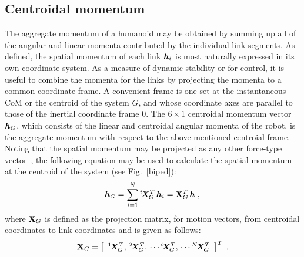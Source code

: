 \documentclass{llncs}
\newcommand{\bA}{\mbox{\boldmath $A$}}
\newcommand{\bh}{\mbox{\boldmath $h$}}
\newcommand{\bq}{\mbox{\boldmath $q$}}
\newcommand{\bqd}{\dot{\bq}}
\newcommand{\vX}{\vec{X}}
\newcommand{\bX}{{\bf X}}
\newcommand{\XM}[2]{{}^{#1}\!\vX_{\!#2}}
\begin{document}
\subsection{Centroidal momentum}

The aggregate momentum of a humanoid may be obtained by summing up all of the angular and linear momenta contributed by the individual link segments. 
As defined, the spatial momentum of each link $\bh_i$ is most
naturally expressed in its own coordinate system.  As a measure of
dynamic stability or for control, it is useful to combine the
momenta for the links by projecting the momenta to a common
coordinate frame.  A convenient frame is one set at the
instantaneous CoM or the centroid of the system
$G$, and whose coordinate axes are parallel to those of the inertial coordinate frame 0.
The $6\times 1$ centroidal momentum vector $\bh_G$, which
consists of the linear and centroidal angular momenta of the robot, is the aggregate momentum with respect to the above-mentioned centroial frame.
Noting that the spatial momentum may be projected as any other
force-type vector~\cite{FeOr08}, the following equation may be used to calculate
the spatial momentum at the centroid of the system (see Fig.~\ref{biped}):
%
\begin{equation}\label{hgt}
\bh_G = \sum_{i=1}^N  \XM{i}{G}^T \, \bh_i = \bX_G^T \, \bh \; ,\\%
\end{equation}
%
%
where $\bX_G$ is defined as the projection matrix, for motion vectors,
from centroidal coordinates to link coordinates and is given as follows:
%
\begin{equation}
\bX_G = \left[ \begin{array}{c} \XM{1}{G}^T, \, \XM{2}{G}^T, \,
\cdots \XM{i}{G}^T, \, \cdots \XM{N}{G}^T \end{array} \right]^T \; .
\end{equation}
%
\end{document}
